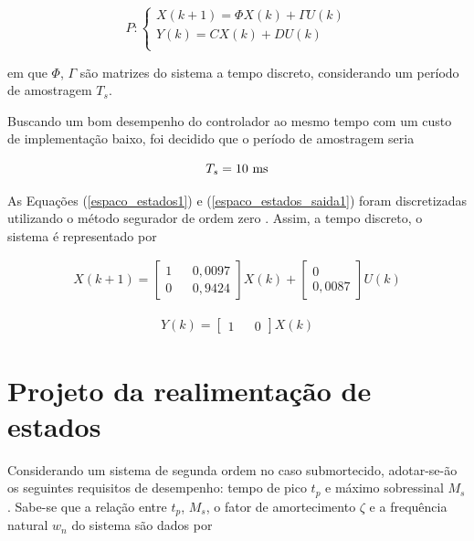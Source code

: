 \begin{equation}
    P :\begin{cases} 
        X(k+1) = \Phi X(k) + \varGamma U(k) \\
        Y(k) = CX(k) + DU(k) \\
        \end{cases}
    \label{modelo_espaco_estados_discreto}
\end{equation}

\noindent em que $\Phi$, $\Gamma$ são matrizes do sistema a tempo discreto, considerando um período de amostragem $T_s$.

Buscando um bom desempenho do controlador ao mesmo tempo com um custo de implementação baixo, foi decidido que o período de amostragem seria

\begin{equation}
    T_s = 10 \textnormal{ ms}
    \label{periodo_amostragem}
\end{equation}

As Equações (\ref{espaco_estados1}) e (\ref{espaco_estados_saida1}) foram discretizadas utilizando o método segurador de ordem zero \cite{franklin2013sistemas}. Assim, a tempo discreto, o sistema é representado por

\begin{gather}
    X(k+1)=
    \begin{bmatrix}
        1 && 0,0097 \\ 0 && 0,9424
    \end{bmatrix}
    X(k)
    +
    \begin{bmatrix}
        0 \\ 0,0087
    \end{bmatrix}
    U(k)
    \label{espaco_estados_d}
\end{gather}

\begin{gather}
    Y(k)=
    \begin{bmatrix}
        1 && 0
    \end{bmatrix}
    X(k)
    \label{espaco_estados_saida_d}
\end{gather}

\section{Projeto da realimentação de estados}

Considerando um sistema de segunda ordem no caso submortecido, adotar-se-ão os seguintes requisitos de desempenho: tempo de pico $t_p$ e máximo sobressinal $M_s$. Sabe-se que a relação entre $t_p$, $M_s$, o fator de amortecimento $\zeta$ e a frequência natural $w_n$ do sistema são dados por \cite{ogata2010engenharia}

